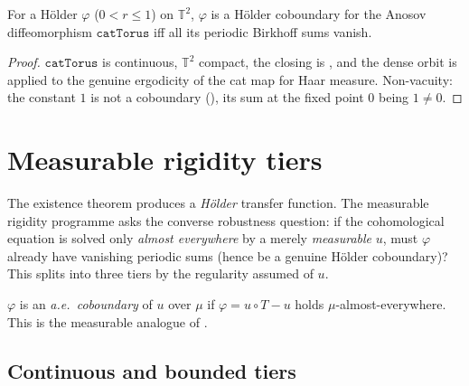 \begin{theorem}\label{thm:livsic-cat}
  \leanok
  For a Hölder \(\varphi\) (\(0 < r\le 1\)) on \(\mathbb{T}^2\), \(\varphi\) is a Hölder coboundary for the
  Anosov diffeomorphism \(\texttt{catTorus}\) iff all its periodic Birkhoff sums vanish.
\end{theorem}
\begin{proof}\leanok
  \(\texttt{catTorus}\) is continuous, \(\mathbb{T}^2\) compact, the closing is
  , and the dense orbit is  applied to
  the genuine ergodicity of the cat map for Haar measure. Non-vacuity: the constant \(1\) is not a
  coboundary (), its sum at the
  fixed point \(0\) being \(1\ne 0\).
\end{proof}

\section{Measurable rigidity tiers}

The existence theorem produces a \emph{Hölder} transfer function. The measurable rigidity programme
asks the converse robustness question: if the cohomological equation is solved only
\emph{almost everywhere} by a merely \emph{measurable} \(u\), must \(\varphi\) already have vanishing
periodic sums (hence be a genuine Hölder coboundary)? This splits into three tiers by the regularity
assumed of \(u\).

\begin{definition}\label{def:livsic-aecob}
  \leanok
  \(\varphi\) is an \emph{a.e.\ coboundary} of \(u\) over \(\mu\) if \(\varphi = u\circ T - u\) holds
  \(\mu\)-almost-everywhere. This is the measurable analogue of .
\end{definition}

\subsection{Continuous and bounded tiers}

